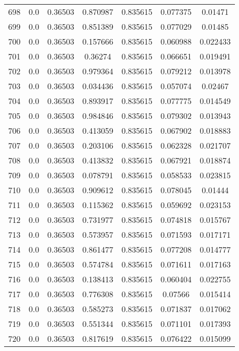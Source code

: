 \begin{table}
\begin{tabular*}{\linewidth}{c|c|c|c|c|c|c}
698 & 0.0 & 0.36503 & 0.870987 & 0.835615 & 0.077375 & 0.01471\\
699 & 0.0 & 0.36503 & 0.851389 & 0.835615 & 0.077029 & 0.01485\\
700 & 0.0 & 0.36503 & 0.157666 & 0.835615 & 0.060988 & 0.022433\\
701 & 0.0 & 0.36503 & 0.36274 & 0.835615 & 0.066651 & 0.019491\\
702 & 0.0 & 0.36503 & 0.979364 & 0.835615 & 0.079212 & 0.013978\\
703 & 0.0 & 0.36503 & 0.034436 & 0.835615 & 0.057074 & 0.02467\\
704 & 0.0 & 0.36503 & 0.893917 & 0.835615 & 0.077775 & 0.014549\\
705 & 0.0 & 0.36503 & 0.984846 & 0.835615 & 0.079302 & 0.013943\\
706 & 0.0 & 0.36503 & 0.413059 & 0.835615 & 0.067902 & 0.018883\\
707 & 0.0 & 0.36503 & 0.203106 & 0.835615 & 0.062328 & 0.021707\\
708 & 0.0 & 0.36503 & 0.413832 & 0.835615 & 0.067921 & 0.018874\\
709 & 0.0 & 0.36503 & 0.078791 & 0.835615 & 0.058533 & 0.023815\\
710 & 0.0 & 0.36503 & 0.909612 & 0.835615 & 0.078045 & 0.01444\\
711 & 0.0 & 0.36503 & 0.115362 & 0.835615 & 0.059692 & 0.023153\\
712 & 0.0 & 0.36503 & 0.731977 & 0.835615 & 0.074818 & 0.015767\\
713 & 0.0 & 0.36503 & 0.573957 & 0.835615 & 0.071593 & 0.017171\\
714 & 0.0 & 0.36503 & 0.861477 & 0.835615 & 0.077208 & 0.014777\\
715 & 0.0 & 0.36503 & 0.574784 & 0.835615 & 0.071611 & 0.017163\\
716 & 0.0 & 0.36503 & 0.138413 & 0.835615 & 0.060404 & 0.022755\\
717 & 0.0 & 0.36503 & 0.776308 & 0.835615 & 0.07566 & 0.015414\\
718 & 0.0 & 0.36503 & 0.585273 & 0.835615 & 0.071837 & 0.017062\\
719 & 0.0 & 0.36503 & 0.551344 & 0.835615 & 0.071101 & 0.017393\\
720 & 0.0 & 0.36503 & 0.817619 & 0.835615 & 0.076422 & 0.015099\\
\end{tabular*}
\end{table}
\newpage
